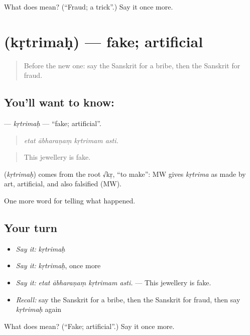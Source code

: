 \begin{tcolorbox}[breakable,colback=teal!4,colframe=teal!35!black,title={Before you move on}]
What does  mean? (\textquotedblleft{}Fraud; a trick\textquotedblright{}.) Say it once more.
\end{tcolorbox}
\section[\texorpdfstring{\sk{कृत्रिमः} (kṛtrimaḥ)}{कृत्रिमः (kṛtrimaḥ)}]{ (kṛtrimaḥ) — fake; artificial}

\label{lesson:SA-C291-krtrimah}



\begin{quote}
Before the new one: say the Sanskrit for a bribe, then the Sanskrit for fraud.
\end{quote}

\subsection*{You'll want to know: }
\textbf{} — \emph{kṛtrimaḥ} — \textquotedblleft{}fake; artificial\textquotedblright{}.

\begin{quote}
   
\end{quote}

\begin{quote}
\emph{etat ābharaṇaṃ kṛtrimam asti.}
\end{quote}

\begin{quote}
This jewellery is fake.
\end{quote}

\begin{cousinweb}
\textbf{} (\emph{kṛtrimaḥ}) comes from the root √kṛ, \textquotedblleft{}to make\textquotedblright{}: MW gives \emph{kṛtrima} as made by art, artificial, and also falsified (MW).
\end{cousinweb}

\begin{grammarlens}[title={What you've built}]
One more word for telling what happened.
\end{grammarlens}

\subsection*{Your turn}
\begin{itemize}
\raggedright
  \item \emph{Say it:} \emph{kṛtrimaḥ}
  \item \emph{Say it:} \emph{kṛtrimaḥ}, once more
  \item \emph{Say it:} \emph{etat ābharaṇaṃ kṛtrimam asti.} — This jewellery is fake.
  \item \emph{Recall:} say the Sanskrit for a bribe, then the Sanskrit for fraud, then say \emph{kṛtrimaḥ} again
\end{itemize}

\begin{tcolorbox}[breakable,colback=teal!4,colframe=teal!35!black,title={Before you move on}]
What does  mean? (\textquotedblleft{}Fake; artificial\textquotedblright{}.) Say it once more.
\end{tcolorbox}

